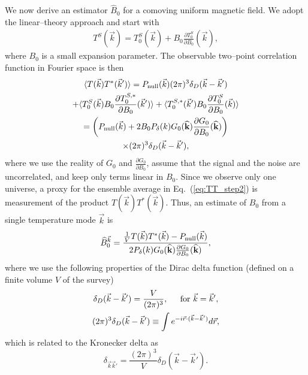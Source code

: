 \documentclass[aps,prd,twocolumn,floatfix,showpacs,superscriptaddress,nofootinbib]{revtex4-1}
\newcommand{\beq}{\begin{equation}}
\newcommand{\eeq}{\end{equation}}
\newcommand{\bga}{\begin{gathered}}
\newcommand{\ega}{\end{gathered}}
\newcommand{\eq}[1]{{Eq.~(#1)}}
\begin{document}
We now derive an estimator $\widehat B_0$ for a comoving uniform magnetic field. We adopt the linear--theory approach and start with
\beq
\bga
T^S(\vec k) = T^S_0(\vec k) + B_0\frac{\partial T^S_0}{\partial B_0}(\vec k),
\ega
\label{eq:TS_uniform}
\eeq
where $B_0$ is a small expansion parameter. The observable two--point correlation function in Fourier space is then
\beq
\bga
\langle T(\vec k)T^*(\vec k')\rangle = P_\text{null}(\vec k)(2\pi)^3\delta_D(\vec k-\vec k') \\
+ \langle T^S_0(\vec k)B_0\frac{\partial T_0^{S,*}}{\partial B_0}(\vec k')\rangle + \langle T_0^{S,*}(\vec k')B_0\frac{\partial T_0^S}{\partial B_0}(\vec k)\rangle\\
=\left(P_\text{null}(\vec k)
 + 2B_0P_{\delta}( k)G_0({\bf{\widehat k}})\frac{\partial G_0}{\partial B_0}({\bf{\widehat k}}) \right) \\\times(2\pi)^3\delta_D(\vec k-\vec k'),
\ega
\label{eq:TT_step2}
\eeq
where we use the reality of $G_0$ and $\frac{\partial G_0}{\partial B_0}$, assume that the signal and the noise are uncorrelated, and keep only terms linear in $B_0$. Since we observe only one universe, a proxy for the ensemble average in \eq{\ref{eq:TT_step2}} is measurement of the product $T(\vec k)T^*(\vec k)$. Thus, an estimate of $B_0$ from a single temperature mode $\vec k$ is
\beq
\widehat B_0^{\vec k} = \frac{\frac{1}{V}T(\vec k)T^*(\vec k) - P_\text{null}(\vec k)}{2P_{\delta}( k)G_0({\bf{\widehat k}})\frac{\partial G_0}{\partial B_0}({\bf{\widehat k}})},
\label{eq:hatBk}
\eeq 
where we use the following properties of the Dirac delta function (defined on a finite volume $V$ of the survey)
\beq
\bga
\delta_D(\vec k-\vec k') = \frac{V}{(2\pi)^3},\hspace{0.2in} \text{for }\vec k = \vec k',\\
(2\pi)^3\delta_D(\vec k - \vec k') \equiv \int e^{-i\vec r \cdot (\vec k-\vec k')}d\vec r,
\ega
\label{eq:delta_kk}
\eeq
which is related to the Kronecker delta as
\beq
\delta_{\vec k\vec k'} = \frac{(2\pi)^3}{V}\delta_D(\vec k-\vec k').
\label{eq:deltas}
\eeq
\end{document}

